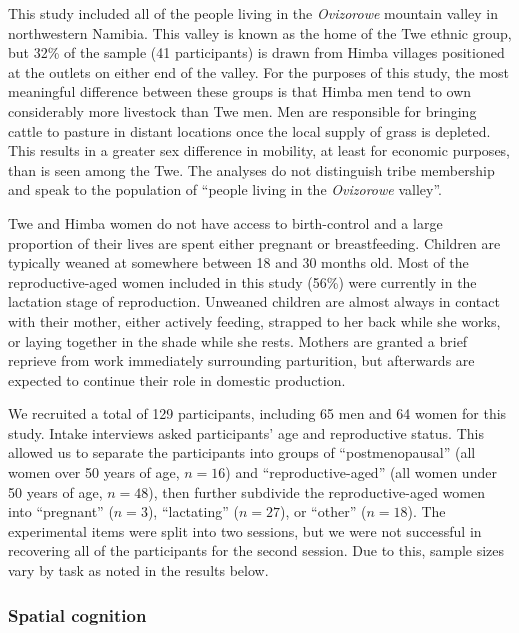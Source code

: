 This study included all of the people living in the \emph{Ovizorowe} mountain valley in northwestern Namibia.  This valley is known as the home of the Twe ethnic group, but 32\% of the sample (41 participants) is drawn from Himba villages positioned at the outlets on either end of the valley.  For the purposes of this study, the most meaningful difference between these groups is that Himba men tend to own considerably more livestock than Twe men.  Men are responsible for bringing cattle to pasture in distant locations once the local supply of grass is depleted.  This results in a greater sex difference in mobility, at least for economic purposes, than is seen among the Twe.  The analyses do not distinguish tribe membership and speak to the population of ``people living in the \emph{Ovizorowe} valley''.

Twe and Himba women do not have access to birth-control and a large proportion of their lives are spent either pregnant or breastfeeding.  Children are typically weaned at somewhere between 18 and 30 months old.  Most of the reproductive-aged women included in this study (56\%) were currently in the lactation stage of reproduction.  Unweaned children are almost always in contact with their mother, either actively feeding, strapped to her back while she works, or laying together in the shade while she rests.  Mothers are granted a brief reprieve from work immediately surrounding parturition, but afterwards are expected to continue their role in domestic production.

We recruited a total of 129 participants, including 65 men and 64 women for this study.  Intake interviews asked participants' age and reproductive status.  This allowed us to separate the participants into groups of ``postmenopausal'' (all women over 50 years of age, $n = 16$) and ``reproductive-aged'' (all women under 50 years of age, $n = 48$), then further subdivide the reproductive-aged women into ``pregnant'' ($n = 3$), ``lactating'' ($n = 27$), or ``other'' ($n = 18$).  The experimental items were split into two sessions, but we were not successful in recovering all of the participants for the second session.  Due to this, sample sizes vary by task as noted in the results below.

		\subsubsection{Spatial cognition}
		\label{sec:2.2.1}		
